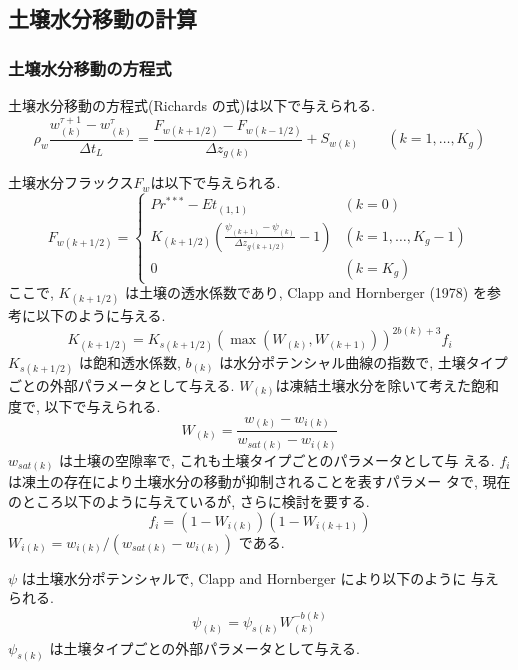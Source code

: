 \subsection{土壌水分移動の計算}

\subsubsection{土壌水分移動の方程式}

土壌水分移動の方程式(Richards の式)は以下で与えられる. 
\begin{equation}
\rho_w \frac{w_{(k)}^{\tau+1} - w_{(k)}^{\tau}}{\Delta t_L} = 
\frac{F_{w(k+1/2)} - F_{w(k-1/2)}}{\Delta z_{g(k)}} + S_{w(k)}
\qquad (k=1,\ldots,K_{g}) 
\label{wat_diff}
\end{equation}

土壌水分フラックス$F_{w}$は以下で与えられる. 
\begin{equation}
 F_{w(k+1/2)} =
\left\{
\begin{array}{ll}
Pr^{***} - Et_{(1,1)}
& (k=0)\\
\displaystyle{
K_{(k+1/2)} \left(\frac{\psi_{(k+1)} - \psi_{(k)}}{\Delta z_{g(k+1/2)}} - 1 \right)
}
& (k=1,\ldots,K_{g}-1) \\
\displaystyle{
0
}
& (k=K_{g})
\end{array}
\right. 
\label{wat_dflux}
\end{equation}
ここで, $K_{(k+1/2)}$ は土壌の透水係数であり, Clapp and Hornberger
(1978) を参考に以下のように与える. 
\begin{equation}
 K_{(k+1/2)} = K_{s(k+1/2)} (\max(W_{(k)},W_{(k+1)}))^{2b(k)+3} f_i
\end{equation}
$K_{s(k+1/2)}$ は飽和透水係数, $b_{(k)}$ は水分ポテンシャル曲線の指数で,
土壌タイプごとの外部パラメータとして与える. 
$W_{(k)}$は凍結土壌水分を除いて考えた飽和度で, 以下で与えられる. 
\begin{equation}
 W_{(k)} = \frac{w_{(k)}-w_{i(k)}}{w_{sat(k)}-w_{i(k)}} 
\end{equation}
$w_{sat(k)}$ は土壌の空隙率で, これも土壌タイプごとのパラメータとして与
える. $f_i$ は凍土の存在により土壌水分の移動が抑制されることを表すパラメー
タで, 現在のところ以下のように与えているが, さらに検討を要する. 
\begin{equation}
 f_i = \left(1- W_{i(k)}\right)
       \left(1- W_{i(k+1)}\right)
\end{equation}
$W_{i(k)} = w_{i(k)}/(w_{sat(k)}-w_{i(k)})$ である. 

$\psi$ は土壌水分ポテンシャルで, Clapp and Hornberger により以下のように
与えられる. 
\begin{eqnarray}
 \psi_{(k)} = \psi_{s(k)} W_{(k)}^{-b(k)}
\end{eqnarray}
$\psi_{s(k)}$ は土壌タイプごとの外部パラメータとして与える. 

